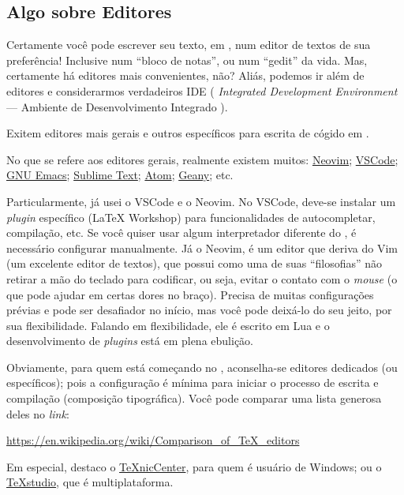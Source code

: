 \subsection{Algo sobre Editores} %

Certamente você pode escrever seu texto, em \LaTeXX, num editor de textos de 
sua preferência! 
Inclusive num ``bloco de notas'', ou num ``gedit'' da vida. 
Mas, certamente há editores mais convenientes, não?
Aliás, podemos ir além de editores e considerarmos verdadeiros IDE (
\textit{Integrated Development Environment} --- Ambiente de Desenvolvimento Integrado ).

Exitem editores mais gerais e outros específicos para escrita de cógido em 
\LaTeXX. 

No que se refere aos editores gerais, realmente existem muitos:
\href{https://neovim.io/}{Neovim};
\href{https://code.visualstudio.com/}{VSCode};
\href{https://www.gnu.org/software/emacs/}{GNU Emacs};
\href{https://www.sublimetext.com/}{Sublime Text}; 
\href{https://atom.io/}{Atom};
\href{https://www.geany.org/}{Geany};
etc.

Particularmente, já usei o VSCode e o Neovim.
No VSCode, deve-se instalar um \textit{plugin} específico (LaTeX Workshop) para 
funcionalidades de autocompletar, compilação, etc.
Se você quiser usar algum interpretador diferente do , é 
necessário configurar manualmente. 
Já o Neovim, é um editor que deriva do Vim (um excelente editor de textos), que 
possui como uma de suas ``filosofias'' não retirar a mão do teclado para 
codificar, ou seja, evitar o contato com o \textit{mouse} (o que pode ajudar em 
certas dores no braço). 
Precisa de muitas configurações prévias e pode ser desafiador no início, mas 
você pode deixá-lo do seu jeito, por sua flexibilidade. 
Falando em flexibilidade, ele é escrito em Lua e o desenvolvimento de 
\textit{plugins} está em plena ebulição. 

Obviamente, para quem está começando no \LaTeXX, aconselha-se editores 
dedicados (ou específicos); pois a configuração é mínima para iniciar o 
processo de escrita e compilação (composição tipográfica).
Você pode comparar uma lista generosa deles no \textit{link}:

\begin{center}
  \footnotesize
  \url{https://en.wikipedia.org/wiki/Comparison_of_TeX_editors}
\end{center}

Em especial, destaco o \href{https://www.texniccenter.org/}{\TeX nicCenter}, 
para quem é usuário de Windows; ou o 
\href{https://www.texstudio.org/}{\TeX studio}, que é multiplataforma. 

